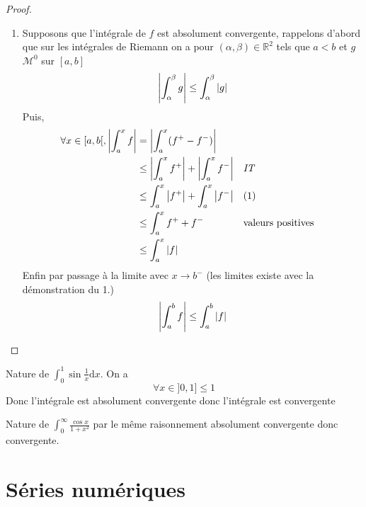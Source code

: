 \documentclass[11pt,colorlinks]{book}
\theoremstyle{mytheoremstyle}
\theoremstyle{mytheoremstyle}
\theoremstyle{mytheoremstyle}
\theoremstyle{mytheoremstyle}
\theoremstyle{mytheoremstyle}
\theoremstyle{mytheoremstyle}
\theoremstyle{mytheoremstyle}
\theoremstyle{mytheoremstyle}
\theoremstyle{myproblemstyle}
\def\mbb#1{\mathbb{#1}}
\def\bR{\mbb{R}}
\def\mM{\mathcal{M}}
\begin{document}
\begin{theorem}[Comparaison]
\begin{proof}
\begin{enumerate}
        \item Supposons que l'intégrale de $f$ est absolument convergente, rappelons d'abord que sur les intégrales de Riemann on a 
      pour $(\alpha,\beta) \in \bR^2$ tels que $a < b$ et $g$ $\mM^0$ sur $[a,b]$
      \begin{equation}
        \abs{\int_{\alpha}^{\beta} g} \leq \int_{\alpha}^{\beta} \abs{g}
      \end{equation}
      Puis,
      \begin{align*}
        \forall x \in [a,b[, \abs{\int_a^x f} &= \abs{\int_a^x (f^{+} - f^{-})} \\ 
        &\leq \abs{\int_a^x f^{+}} + \abs{\int_a^x f^{-}} && \textit{IT} \\ 
        &\leq \int_a^x \abs{f^{+}} + \int_a^x \abs{f^{-}} && (1)\\ 
        &\leq \int_a^x f^{+} + f^{-} && \text{valeurs positives} \\
        &\leq \int_a^x \abs{f}
      \end{align*}
      Enfin par passage à la limite avec $x \to b^{-}$ (les limites existe avec la démonstration du 1.)
      \begin{equation*}
        \abs{\int_a^b f} \leq \int_a^b \abs{f}
      \end{equation*}
    \end{enumerate}
    \end{proof}
  \end{theorem}
  \begin{ex}
    Nature de $\int_0^1 \sin \frac{1}{x} \text{d}x$. 
    On a 
    \begin{equation*}
      \forall x \in ]0,1] \leq 1 
    \end{equation*}
    Donc l'intégrale est absolument convergente donc l'intégrale est convergente
  \end{ex}
  \begin{ex}
    Nature de $\int_0^{\infty} \frac{\cos x}{1+x^2}$ par le même raisonnement absolument convergente donc convergente.
  \end{ex}



\chapter{Séries numériques}
\end{document}
